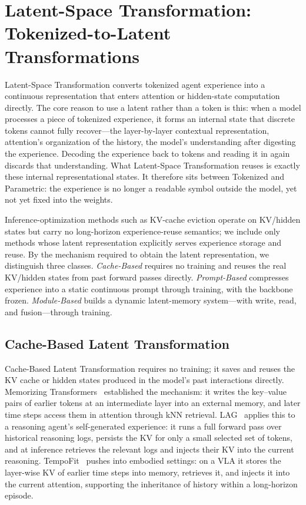 \section{Latent-Space Transformation: Tokenized-to-Latent Transformations}
\label{sec:tok2latent}

Latent-Space Transformation converts tokenized agent experience into a continuous representation that enters attention or hidden-state computation directly. The core reason to use a latent rather than a token is this: when a model processes a piece of tokenized experience, it forms an internal state that discrete tokens cannot fully recover---the layer-by-layer contextual representation, attention's organization of the history, the model's understanding after digesting the experience. Decoding the experience back to tokens and reading it in again discards that understanding. What Latent-Space Transformation reuses is exactly these internal representational states. It therefore sits between Tokenized and Parametric: the experience is no longer a readable symbol outside the model, yet not yet fixed into the weights.

Inference-optimization methods such as KV-cache eviction operate on KV/hidden states but carry no long-horizon experience-reuse semantics; we include only methods whose latent representation explicitly serves experience storage and reuse. By the mechanism required to obtain the latent representation, we distinguish three classes. \emph{Cache-Based} requires no training and reuses the real KV/hidden states from past forward passes directly. \emph{Prompt-Based} compresses experience into a static continuous prompt through training, with the backbone frozen. \emph{Module-Based} builds a dynamic latent-memory system---with write, read, and fusion---through training.

\subsection{Cache-Based Latent Transformation}

Cache-Based Latent Transformation requires no training; it saves and reuses the KV cache or hidden states produced in the model's past interactions directly. Memorizing Transformers~\cite{Wu22} established the mechanism: it writes the key--value pairs of earlier tokens at an intermediate layer into an external memory, and later time steps access them in attention through kNN retrieval. LAG~\cite{Che25b} applies this to a reasoning agent's self-generated experience: it runs a full forward pass over historical reasoning logs, persists the KV for only a small selected set of tokens, and at inference retrieves the relevant logs and injects their KV into the current reasoning. TempoFit~\cite{Sun26} pushes into embodied settings: on a VLA it stores the layer-wise KV of earlier time steps into memory, retrieves it, and injects it into the current attention, supporting the inheritance of history within a long-horizon episode.

